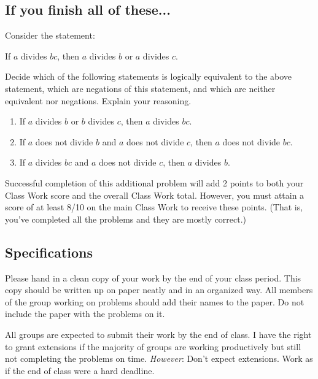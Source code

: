 \documentclass[11pt]{article}
\begin{document}
\subsection*{If you finish all of these...}

Consider the statement: 
\begin{center}
	If $a$ divides $bc$, then $a$ divides $b$ or $a$ divides $c$. 
\end{center}
Decide which of the following statements is logically equivalent to the above statement, which are negations of this statement, and which are neither equivalent nor negations. Explain your reasoning. 
	\begin{enumerate}
		\item If $a$ divides $b$ or $b$ divides $c$, then $a$ divides $bc$. 
		\item If $a$ does not divide $b$ and $a$ does not divide $c$, then $a$ does not divide $bc$. 
		\item If $a$ divides $bc$ and $a$ does not divide $c$, then $a$ divides $b$. 
	\end{enumerate}



Successful completion of this additional problem will add 2 points to both your Class Work score and the overall Class Work total. However, you must attain a score of at least 8/10 on the main Class Work to receive these points. (That is, you've completed all the problems and they are mostly correct.) 	
	
\subsection*{Specifications}

Please hand in a clean copy of your work by the end of your class period. This copy should be written up on paper neatly and in an organized way. All members of the group working on problems should add their names to the paper. Do not include the paper with the problems on it. 

All groups are expected to submit their work by the end of class. I have the right to grant extensions if the majority of groups are working productively but still not completing the problems on time. \emph{However}: Don't expect extensions. Work as if the end of class were a hard deadline. 
\end{document}

